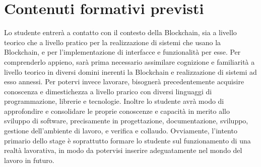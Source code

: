 \section*{Contenuti formativi previsti}
Lo studente entrerà a contatto con il contesto della Blockchain, sia a livello teorico che a livello pratico per la realizzazione di sistemi che usano la Blockchain, e per l'implementazione di interfacce e funzionalità per esse. 
Per comprenderlo appieno, sarà prima necessario assimilare cognizione e familiarità a livello teorico in diversi domini inerenti la Blockchain e realizzazione di sistemi ad esso annessi. Per potervi invece lavorare, bisognerà precedentemente acquisire conoscenza e dimestichezza a livello prarico con diversi linguaggi di programmazione, librerie e tecnologie.
Inoltre lo studente avrà modo di approfondire e consolidare le proprie conoscenze e capacità in merito allo sviluppo di software, precisamente in progettazione, documentazione, sviluppo, gestione dell'ambiente di lavoro, e verifica e collaudo. Ovviamente, l'intento primario dello stage è soprattutto formare lo studente sul funzionamento di una realtà lavorativa, in modo da potervisi inserire adeguatamente nel mondo del lavoro in futuro.
\newpage